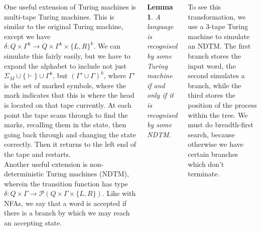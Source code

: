 \documentclass{tikzposter} %
\newtheorem{lemma}[theorem]{Lemma}
\begin{document}
\begin{columns}
{      One useful extension of Turing machines is multi-tape Turing machines. This is similar to the original Turing machine, except we have $\delta : Q \times \Gamma^{k} \to Q \times \Gamma^{k} \times \{ L, R\}^{k}$. We can simulate this fairly easily, but we have to expand the alphabet to include not just $\Sigma_{M} \cup \{\vdash\} \cup \Gamma^{k}$, but $(\Gamma' \cup \Gamma)^{k}$, where $\Gamma'$ is the set of marked symbols, where the mark indicates that this is where the head is located on that tape currently. At each point the tape scans through to find the marks, recalling them in the state, then going back through and changing the state correctly. Then it returns to the left end of the tape and restarts. \\

      Another useful extension is non-deterministic Turing machines (NDTM), wherein the transition function has type $\delta : Q \times \Gamma \to \mathcal{P}(Q \times \Gamma \times \{ L, R\})$. Like with NFAs, we say that a word is accepted if there is a branch by which we may reach an accepting state. \\

      \begin{lemma}
        A language is recognised by some Turing machine if and only if it is recognised by some NDTM.
      \end{lemma}
      \hphantom{}

      To see this transformation, we use a 3-tape Turing machine to simulate an NDTM. The first branch stores the input word, the second simulates a branch, while the third stores the position of the process within the tree. We must do breadth-first search, because otherwise we have certain branches which don't terminate.
    }
\end{columns}
\end{document}

